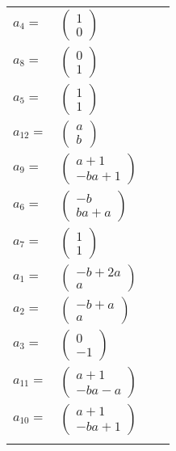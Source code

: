 \documentclass[1p]{elsarticle_modified}
\theoremstyle{definition}
\begin{document}
\begin{tabular}{m{7pt} m{180pt} m{7pt} m{180pt} }
\flushright $a_{4}=$&$\begin{pmatrix}1\\0\end{pmatrix}$ \\
\flushright $a_{8}=$&$\begin{pmatrix}0\\1\end{pmatrix}$ \\
\flushright $a_{5}=$&$\begin{pmatrix}1\\1\end{pmatrix}$ \\
\flushright $a_{12}=$&$\begin{pmatrix}a\\b\end{pmatrix}$ \\
\flushright $a_{9}=$&$\begin{pmatrix}a+1\\- b a+1\end{pmatrix}$ \\
\flushright $a_{6}=$&$\begin{pmatrix}- b\\b a+a\end{pmatrix}$ \\
\flushright $a_{7}=$&$\begin{pmatrix}1\\1\end{pmatrix}$ \\
\flushright $a_{1}=$&$\begin{pmatrix}- b+2 a\\a\end{pmatrix}$ \\
\flushright $a_{2}=$&$\begin{pmatrix}- b+a\\a\end{pmatrix}$ \\
\flushright $a_{3}=$&$\begin{pmatrix}0\\-1\end{pmatrix}$ \\
\flushright $a_{11}=$&$\begin{pmatrix}a+1\\- b a- a\end{pmatrix}$ \\
\flushright $a_{10}=$&$\begin{pmatrix}a+1\\- b a+1\end{pmatrix}$\\&\end{tabular}
\end{document}
